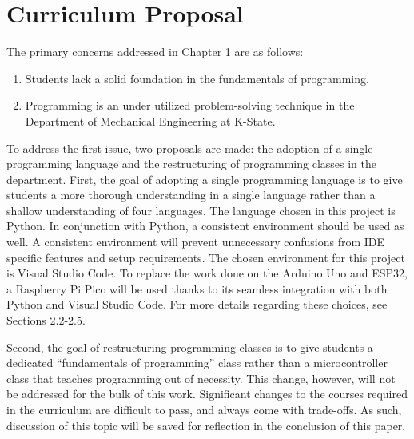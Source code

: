 \section{Curriculum Proposal}

The primary concerns addressed in Chapter 1 are as follows:

\begin{enumerate}
    \item Students lack a solid foundation in the fundamentals of programming.
    \item Programming is an under utilized problem-solving technique in the Department of Mechanical
    Engineering at K-State.
\end{enumerate}
To address the first issue, two proposals are made: the adoption of a single programming 
language and the restructuring of programming classes in the department. First, the goal of adopting a single 
programming language is to give students a more thorough understanding in a single language rather than 
a shallow understanding of four languages. The language chosen in this project is Python. In conjunction with 
Python, a consistent environment should be used as well. A consistent environment will prevent unnecessary 
confusions from IDE specific features and setup requirements. The chosen environment for this project is 
Visual Studio Code. To replace the work done on the Arduino Uno and ESP32, a Raspberry Pi Pico will be used 
thanks to its seamless integration with both Python and Visual Studio Code. For more details regarding these 
choices, see Sections 2.2-2.5.

Second, the goal of restructuring programming classes is to give students a dedicated ``fundamentals of 
programming'' class rather than a microcontroller class that teaches programming out of necessity. This
change, however, will not be addressed for the bulk of this work. Significant changes to the courses
required in the curriculum are difficult to pass, and always come with trade-offs. As such, discussion of 
this topic will be saved for reflection in the conclusion of this paper.



